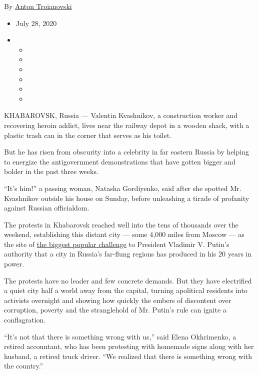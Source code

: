 By \href{https://www.nytimes.com/by/anton-troianovski}{Anton
Troianovski}

\begin{itemize}
\item
  July 28, 2020
\item
  \begin{itemize}
  \item
  \item
  \item
  \item
  \item
  \item
  \end{itemize}
\end{itemize}

KHABAROVSK, Russia --- Valentin Kvashnikov, a construction worker and
recovering heroin addict, lives near the railway depot in a wooden
shack, with a plastic trash can in the corner that serves as his toilet.

But he has risen from obscurity into a celebrity in far eastern Russia
by helping to energize the antigovernment demonstrations that have
gotten bigger and bolder in the past three weeks.

``It's him!'' a passing woman, Natasha Gordiyenko, said after she
spotted Mr. Kvashnikov outside his house on Sunday, before unleashing a
tirade of profanity against Russian officialdom.

The protests in Khabarovsk reached well into the tens of thousands over
the weekend, establishing this distant city --- some 4,000 miles from
Moscow --- as the site of
\href{https://www.nytimes.com/2020/07/25/world/europe/russia-protests-putin-khabarovsk.html}{the
biggest popular challenge} to President Vladimir V. Putin's authority
that a city in Russia's far-flung regions has produced in his 20 years
in power.

The protests have no leader and few concrete demands. But they have
electrified a quiet city half a world away from the capital, turning
apolitical residents into activists overnight and showing how quickly
the embers of discontent over corruption, poverty and the stranglehold
of Mr. Putin's rule can ignite a conflagration.

``It's not that there is something wrong with us,'' said Elena
Okhrimenko, a retired accountant, who has been protesting with homemade
signs along with her husband, a retired truck driver. ``We realized that
there is something wrong with the country.''

